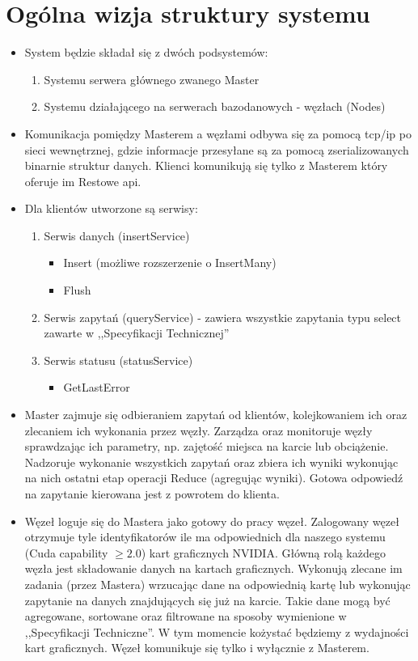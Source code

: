 \documentclass[paper=a4, fontsize=11pt]{scrartcl} %
\numberwithin{equation}{section} %
\numberwithin{figure}{section} %
\numberwithin{table}{section} %
\begin{document}
\section{Ogólna wizja struktury systemu}
\begin{itemize}
	\item System będzie składał się z dwóch podsystemów:
		\begin{enumerate}
			\item Systemu serwera głównego zwanego Master
			\item Systemu działającego na serwerach bazodanowych - węzłach (Nodes)
		\end{enumerate}
	\item Komunikacja pomiędzy Masterem a węzłami odbywa się za pomocą tcp/ip po sieci wewnętrznej, gdzie informacje przesyłane są za pomocą 
		zserializowanych binarnie struktur danych. Klienci komunikują się tylko z Masterem który oferuje im Restowe api. 
	\item Dla klientów utworzone są serwisy:
		\begin{enumerate}
			\item Serwis danych (insertService)
				\begin{itemize}
					\item Insert (możliwe rozszerzenie o InsertMany)
					\item Flush
				\end{itemize}
			\item Serwis zapytań (queryService) - zawiera wszystkie zapytania typu select zawarte w ,,Specyfikacji Technicznej''
			\item Serwis statusu (statusService)
				\begin{itemize}
					\item GetLastError
				\end{itemize}
		\end{enumerate}
	\item Master zajmuje się odbieraniem zapytań od klientów, kolejkowaniem ich oraz zlecaniem ich wykonania przez węzły. Zarządza oraz monitoruje 
		węzły sprawdzając ich parametry, np. zajętość miejsca na karcie lub obciążenie. Nadzoruje wykonanie wszystkich zapytań oraz zbiera ich wyniki 
		wykonując na nich ostatni etap operacji Reduce (agregując wyniki). Gotowa odpowiedź na zapytanie kierowana jest z powrotem do klienta.
	\item Węzeł loguje się do Mastera jako gotowy do pracy węzeł. Zalogowany węzeł otrzymuje tyle identyfikatorów ile ma odpowiednich dla naszego systemu 
		(Cuda capability $\geq 2.0$) kart graficznych NVIDIA. Główną rolą każdego węzła jest składowanie danych na kartach graficznych. Wykonują zlecane im 
		zadania (przez Mastera) wrzucając dane na odpowiednią kartę lub wykonując zapytanie na danych znajdujących się już na karcie. Takie dane mogą 
		być agregowane, sortowane oraz filtrowane na sposoby wymienione w ,,Specyfikacji Techniczne''. W tym momencie kożystać będziemy z wydajności 
		kart graficznych. Węzeł komunikuje się tylko i wyłącznie z Masterem.
\end{itemize}
\end{document}
